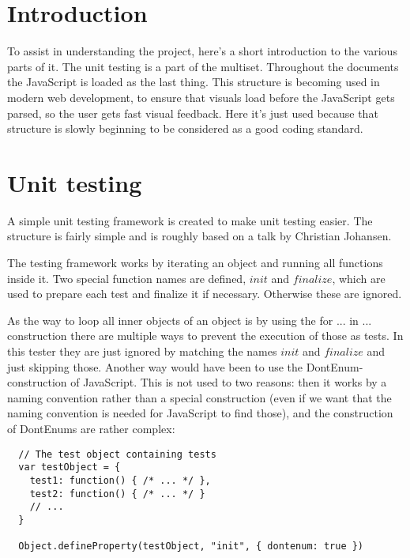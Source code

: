 \documentclass[a4paper,10pt]{article}
\author{
Søren Krogh -  20105661 \\
Emil Madsen - 20105376  \\
K. Rohde Fischer - 20052356\\}
\title{}
\begin{document}
\maketitle

\section*{Introduction}
To assist in understanding the project, here's a short introduction to
the various parts of it.  The unit testing is a part of the multiset.
Throughout the documents the JavaScript is loaded as the last thing.
This structure is becoming used in modern web development, to ensure
that visuals load before the JavaScript gets parsed, so the user gets
fast visual feedback.  Here it's just used because that structure is
slowly beginning to be considered as a good coding standard.

\section*{Unit testing}
A simple unit testing framework is created to make unit testing
easier.  The structure is fairly simple and is roughly based on a talk
by Christian Johansen.

The testing framework works by iterating an object and running all
functions inside it.  Two special function names are defined, $init$
and $finalize$, which are used to prepare each test and finalize it if
necessary.  Otherwise these are ignored.

As the way to loop all inner objects of an object is by using the for
... in ... construction there are multiple ways to prevent the
execution of those as tests.  In this tester they are just ignored by
matching the names $init$ and $finalize$ and just skipping those.
Another way would have been to use the DontEnum-construction of
JavaScript.  This is not used to two reasons: then it works by a
naming convention rather than a special construction (even if we want
that the naming convention is needed for JavaScript to find those),
and the construction of DontEnums are rather complex:

\begin{verbatim}
  // The test object containing tests
  var testObject = {
    test1: function() { /* ... */ },
    test2: function() { /* ... */ }
    // ...
  }

  Object.defineProperty(testObject, "init", { dontenum: true })
\end{verbatim}
\end{document}
